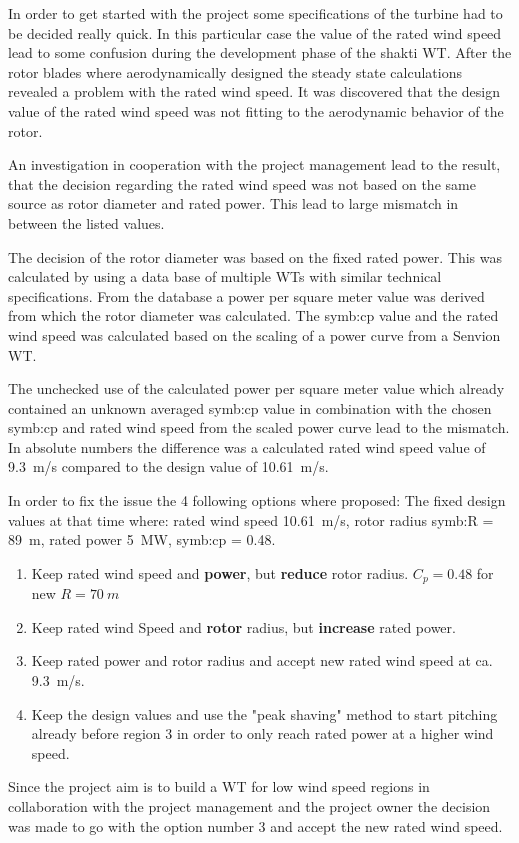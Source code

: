 In order to get started with the project some specifications of the turbine had to be decided really quick.
In this particular case the value of the rated wind speed lead to some confusion during the development phase of the \gls{shakti} WT.
After the rotor blades where aerodynamically designed the steady state calculations revealed a problem with the rated wind speed.
It was discovered that the design value of the rated wind speed was not fitting to the aerodynamic behavior of the rotor.

An investigation in cooperation with the project management lead to the result, that the decision regarding the rated wind speed was not based on the same source as rotor diameter and rated power.
This lead to large mismatch in between the listed values.

The decision of the rotor diameter was based on the fixed rated power. 
This was calculated by using a data base of multiple WTs with similar technical specifications.
From the database a power per square meter value was derived from which the rotor diameter was calculated.
The \gls{symb:cp} value and the rated wind speed was calculated based on the scaling of a power curve from a Senvion WT.

The unchecked use of the calculated power per square meter value which already contained an unknown averaged \gls{symb:cp} value in combination with the chosen \gls{symb:cp} and rated wind speed from the scaled power curve lead to the mismatch. In absolute numbers the difference was a calculated rated wind speed value of \SI{9.3}{m/s} compared to the design value of \SI{10.61}{m/s}.

In order to fix the issue the 4 following options where proposed:
The fixed design values at that time where: rated wind speed \SI{10.61}{m/s}, rotor radius \gls{symb:R} = \SI{89}{m}, rated power \SI{5}{MW}, \gls{symb:cp} = \SI{0.48}{}.
\begin{enumerate}
	\item Keep rated wind speed and \textbf{power}, but \textbf{reduce} rotor radius. $C_p = 0.48$ for new $R= \SI{70}{m}$
	\item Keep rated wind Speed and \textbf{rotor} radius, but \textbf{increase} rated power.
	\item Keep rated power and rotor radius and accept new rated wind speed at ca. \SI{9.3}{m/s}.
	\item Keep the design values and use the "peak shaving" method to start pitching already before region 3 in order to only reach rated power at a higher wind speed.
\end{enumerate}

Since the project aim is to build a WT for low wind speed regions in collaboration with the project management and the project owner the decision was made to go with the option number 3 and accept the new rated wind speed. 